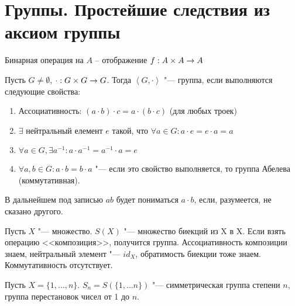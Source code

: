 \section{Группы. Простейшие следствия из аксиом группы}
\begin{Def}
	Бинарная операция на $A$ -- отображение $f : A \times A \rightarrow A$
\end{Def}

\begin{Def}
Пусть $G \neq \emptyset$, $\cdot : G \times G \rightarrow G$.
Тогда $\left<G, \cdot \right>$ "--- группа, если выполняются следующие свойства:
\begin{enumerate}
	\item Ассоциативность: $(a \cdot b) \cdot c = a \cdot (b \cdot c)$ (для любых троек)
	\item $\exists$ нейтральный елемент $e$ такой, что $\forall a \in G \colon a \cdot e = e \cdot a = a$ 
	\item $\forall a \in G, \exists a^{-1} \colon a \cdot a^{-1} = a^{-1} \cdot a = e$		
	\item $\forall a, b \in G \colon a \cdot b = b \cdot a$ "--- если это свойство выполняется, то группа Абелева (коммутативная).
\end{enumerate}
\end{Def}

В дальнейшем под записью $ab$ будет пониматься $a \cdot b$, если, разумеется, не сказано другого.

\begin{exmp}
Пусть $X$ "--- множество. $S(X)$ "--- множество биекций из X в X.
Если взять операцию <<композиция>>, получится группа. Ассоциативность композиции знаем,
нейтральный элемент "--- $id_X$, обратимость биекции тоже знаем. Коммутативность отсутствует.
\end{exmp}

\begin{exmp}
Пусть $X = \{1, \ldots, n\}$. $S_n = S(\{1, \ldots n\})$ "--- симметрическая группа степени $n$,
группа перестановок чисел от 1 до $n$.
\end{exmp}
	
